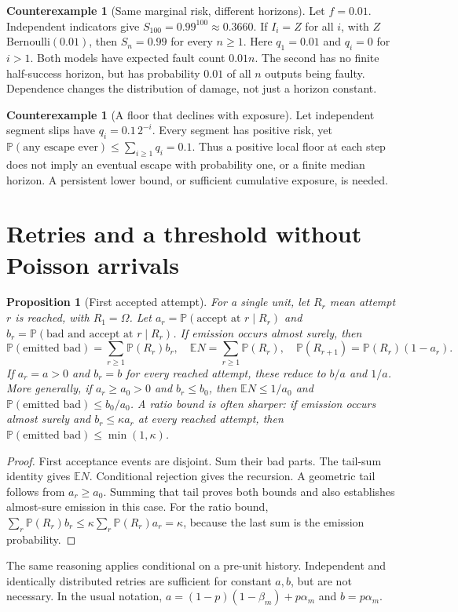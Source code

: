 \documentclass[11pt]{article}
\newtheorem{proposition}[theorem]{Proposition}
\theoremstyle{definition}
\newtheorem{example}[theorem]{Counterexample}
\theoremstyle{remark}
\newcommand{\Prb}{\mathbb P}
\newcommand{\E}{\mathbb E}
\begin{document}
\begin{example}[Same marginal risk, different horizons]\label{ex:shared}
Let $f=0.01$. Independent indicators give $S_{100}=0.99^{100}\approx0.3660$.
If $I_i=Z$ for all $i$, with $Z$ Bernoulli$(0.01)$, then $S_n=0.99$ for every $n\ge1$.
Here $q_1=0.01$ and $q_i=0$ for $i>1$. Both models have expected fault count $0.01n$.
The second has no finite half-success horizon, but has probability $0.01$ of all $n$ outputs
being faulty. Dependence changes the distribution of damage, not just a horizon constant.
\end{example}

\begin{example}[A floor that declines with exposure]\label{ex:summable}
Let independent segment slips have $q_i=0.1\,2^{-i}$. Every segment has positive risk, yet
$\Prb(\text{any escape ever})\le\sum_{i\ge1}q_i=0.1$. Thus a positive local floor at each
step does not imply an eventual escape with probability one, or a finite median horizon.
A persistent lower bound, or sufficient cumulative exposure, is needed.
\end{example}

\section{Retries and a threshold without Poisson arrivals}
\begin{proposition}[First accepted attempt]\label{prop:retry}
For a single unit, let $R_r$ mean attempt $r$ is reached, with $R_1=\Omega$.
Let $a_r=\Prb(\text{accept at }r\mid R_r)$ and
$b_r=\Prb(\text{bad and accept at }r\mid R_r)$. If emission occurs almost surely, then
\begin{equation}\label{eq:retry}
\Prb(\text{emitted bad})=\sum_{r\ge1}\Prb(R_r)b_r,
\quad \E N=\sum_{r\ge1}\Prb(R_r),
\quad \Prb(R_{r+1})=\Prb(R_r)(1-a_r).
\end{equation}
If $a_r=a>0$ and $b_r=b$ for every reached attempt, these reduce to $b/a$ and $1/a$.
More generally, if $a_r\ge a_0>0$ and $b_r\le b_0$, then
$\E N\le1/a_0$ and $\Prb(\text{emitted bad})\le b_0/a_0$.
A ratio bound is often sharper: if emission occurs almost surely and $b_r\le\kappa a_r$ at
every reached attempt, then $\Prb(\text{emitted bad})\le\min(1,\kappa)$.
\end{proposition}
\begin{proof}
First acceptance events are disjoint. Sum their bad parts. The tail-sum identity gives $\E N$.
Conditional rejection gives the recursion. A geometric tail follows from $a_r\ge a_0$.
Summing that tail proves both bounds and also establishes almost-sure emission in this case.
For the ratio bound, $\sum_r\Prb(R_r)b_r\le\kappa\sum_r\Prb(R_r)a_r=\kappa$, because the last
sum is the emission probability.
\end{proof}
The same reasoning applies conditional on a pre-unit history. Independent and identically
distributed retries are sufficient for constant $a,b$, but are not necessary.
In the usual notation, $a=(1-p)(1-\beta_m)+p\alpha_m$ and $b=p\alpha_m$.
\end{document}
